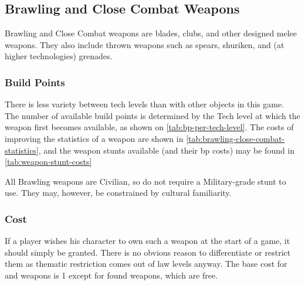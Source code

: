 \subsection{Brawling and Close Combat Weapons}
\label{sec:brawling-and-close-combat-weapons}

Brawling and Close Combat weapons are blades, clubs, and other designed melee weapons. They also include thrown weapons such as spears, shuriken, and (at higher technologies) grenades.

\subsubsection{Build Points}

There is less variety between tech levels than with other objects in this game. The number of available build points is determined by the Tech level at which the weapon first becomes available, as shown on \autoref{tab:bp-per-tech-level}. The costs of improving the statistics of a weapon are shown in \autoref{tab:brawling-close-combat-statistics}, and the weapon stunts available (and their bp costs) may be found in \autoref{tab:weapon-stunt-costs}

% 



All Brawling weapons are Civilian, so do not require a Military-grade stunt to use. They may, however, be constrained by cultural familiarity.

\subsubsection{Cost}

If a player wishes his character to own such a weapon at the start of a game, it should simply be granted. There is no obvious reason to differentiate or restrict them as thematic restriction comes out of law levels anyway. The base cost for  and  weapons is 1 except for found weapons, which are free.

